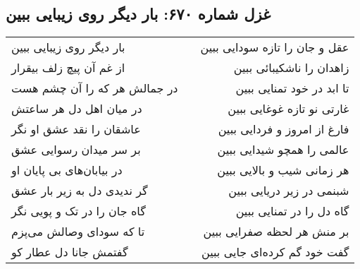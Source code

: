 \begin{center}
\section*{غزل شماره ۶۷۰: بار دیگر روی زیبایی ببین}
\label{sec:670}
\begin{longtable}{l p{0.5cm} r}
بار دیگر روی زیبایی ببین
&&
عقل و جان را تازه سودایی ببین
\\
از غم آن پیچ زلف بیقرار
&&
زاهدان را ناشکیبائی ببین
\\
در جمالش هر که را آن چشم هست
&&
تا ابد در خود تمنایی ببین
\\
در میان اهل دل هر ساعتش
&&
غارتی نو تازه غوغایی ببین
\\
عاشقان را نقد عشق او نگر
&&
فارغ از امروز و فردایی ببین
\\
بر سر میدان رسوایی عشق
&&
عالمی را همچو شیدایی ببین
\\
در بیابان‌های بی پایان او
&&
هر زمانی شیب و بالایی ببین
\\
گر ندیدی دل به زیر بار عشق
&&
شبنمی در زیر دریایی ببین
\\
گاه جان را در تک و پویی نگر
&&
گاه دل را در تمنایی ببین
\\
تا که سودای وصالش می‌پزم
&&
بر منش هر لحظه صفرایی ببین
\\
گفتمش جانا دل عطار کو
&&
گفت خود گم کرده‌ای جایی ببین
\\
\end{longtable}
\end{center}
